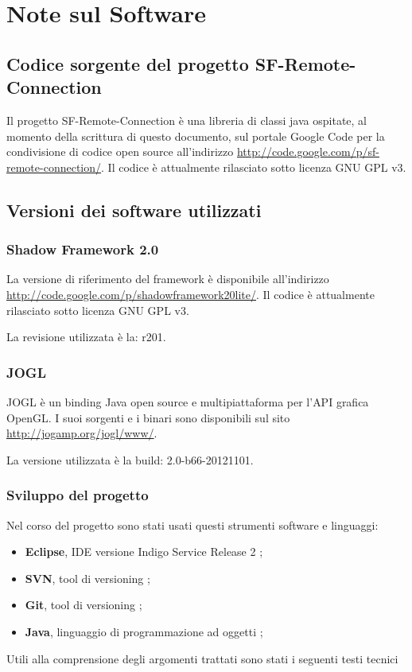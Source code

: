 
\chapter{Note sul Software}
\label{a:notesoftware}

\section{Codice sorgente del progetto SF-Remote-Connection}
\label{sec:sfrcsource}
Il progetto SF-Remote-Connection \`e una libreria di classi java ospitate, al momento della scrittura di questo documento, sul portale Google Code per la condivisione di codice open source all'indirizzo \url{http://code.google.com/p/sf-remote-connection/}.
Il codice \`e attualmente rilasciato sotto licenza GNU GPL v3.

\section{Versioni dei software utilizzati}
\label{sec:versionisw}

\subsection{Shadow Framework 2.0}
\label{sub:sfsource}
La versione di riferimento del framework \`e disponibile all'indirizzo \url{http://code.google.com/p/shadowframework20lite/}. Il codice \`e attualmente rilasciato sotto licenza GNU GPL v3.

La revisione utilizzata \`e la: r201.

\subsection{JOGL}
\label{sub:jogl}
JOGL \`e un binding Java open source e multipiattaforma per l'\ac{API} grafica OpenGL.
I suoi sorgenti e i binari sono disponibili sul sito \url{http://jogamp.org/jogl/www/}.

La versione utilizzata \`e la build: 2.0-b66-20121101.

\subsection{Sviluppo del progetto}
\label{sub:sviluppo}
Nel corso del progetto sono stati usati questi strumenti software e linguaggi:
\begin{itemize}
	\item \textbf{Eclipse}, IDE versione Indigo Service Release 2 \cite{book:eclipse};
	\item \textbf{SVN}, tool di versioning \cite{book:svn};
	\item \textbf{Git}, tool di versioning \cite{site:git};
	\item \textbf{Java}, linguaggio di programmazione ad oggetti \cite{book:java};
\end{itemize}
Utili alla comprensione degli argomenti trattati sono stati i seguenti testi tecnici \cite{book:openglbible, book:librografica}
